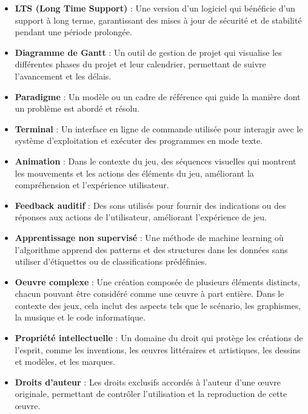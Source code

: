 \begin{itemize}
    \item \textbf{LTS (Long Time Support)} : Une version d'un logiciel qui bénéficie d'un support à long terme, garantissant des mises à jour de sécurité et de stabilité pendant une période prolongée.

    \item \textbf{Diagramme de Gantt} : Un outil de gestion de projet qui visualise les différentes phases du projet et leur calendrier, permettant de suivre l'avancement et les délais.

    \item \textbf{Paradigme} : Un modèle ou un cadre de référence qui guide la manière dont un problème est abordé et résolu.

    \item \textbf{Terminal} : Un interface en ligne de commande utilisée pour interagir avec le système d'exploitation et exécuter des programmes en mode texte.

    \item \textbf{Animation} : Dans le contexte du jeu, des séquences visuelles qui montrent les mouvements et les actions des éléments du jeu, améliorant la compréhension et l'expérience utilisateur.

    \item \textbf{Feedback auditif} : Des sons utilisés pour fournir des indications ou des réponses aux actions de l'utilisateur, améliorant l'expérience de jeu.

    \item \textbf{Apprentissage non supervisé} : Une méthode de machine learning où l'algorithme apprend des patterns et des structures dans les données sans utiliser d'étiquettes ou de classifications prédéfinies.

    \item \textbf{Oeuvre complexe} : Une création composée de plusieurs éléments distincts, chacun pouvant être considéré comme une œuvre à part entière. Dans le contexte des jeux, cela inclut des aspects tels que le scénario, les graphismes, la musique et le code informatique.

    \item \textbf{Propriété intellectuelle} : Un domaine du droit qui protège les créations de l'esprit, comme les inventions, les œuvres littéraires et artistiques, les dessins et modèles, et les marques.

    \item \textbf{Droits d'auteur} : Les droits exclusifs accordés à l'auteur d'une œuvre originale, permettant de contrôler l'utilisation et la reproduction de cette œuvre.


\end{itemize}
